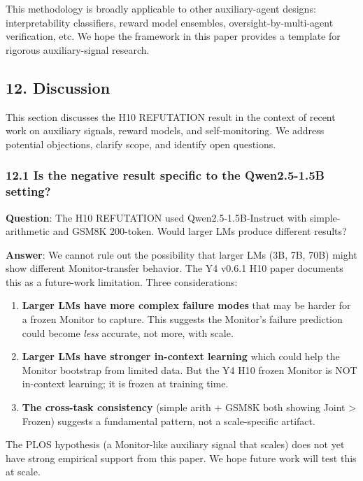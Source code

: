 \documentclass[11pt]{article}
\begin{document}
This methodology is broadly applicable to other auxiliary-agent designs:
interpretability classifiers, reward model ensembles,
oversight-by-multi-agent verification, etc. We hope the framework in
this paper provides a template for rigorous auxiliary-signal research.

\subsection{12. Discussion}\label{discussion}

This section discusses the H10 REFUTATION result in the context of
recent work on auxiliary signals, reward models, and self-monitoring. We
address potential objections, clarify scope, and identify open
questions.

\subsubsection{12.1 Is the negative result specific to the Qwen2.5-1.5B
setting?}\label{is-the-negative-result-specific-to-the-qwen2.5-1.5b-setting}

\textbf{Question}: The H10 REFUTATION used Qwen2.5-1.5B-Instruct with
simple- arithmetic and GSM8K 200-token. Would larger LMs produce
different results?

\textbf{Answer}: We cannot rule out the possibility that larger LMs (3B,
7B, 70B) might show different Monitor-transfer behavior. The Y4 v0.6.1
H10 paper documents this as a future-work limitation. Three
considerations:

\begin{enumerate}
\def\labelenumi{\arabic{enumi}.}
\item
  \textbf{Larger LMs have more complex failure modes} that may be harder
  for a frozen Monitor to capture. This suggests the Monitor's failure
  prediction could become \emph{less} accurate, not more, with scale.
\item
  \textbf{Larger LMs have stronger in-context learning} which could help
  the Monitor bootstrap from limited data. But the Y4 H10 frozen Monitor
  is NOT in-context learning; it is frozen at training time.
\item
  \textbf{The cross-task consistency} (simple arith + GSM8K both showing
  Joint \textgreater{} Frozen) suggests a fundamental pattern, not a
  scale-specific artifact.
\end{enumerate}

The PLOS hypothesis (a Monitor-like auxiliary signal that scales) does
not yet have strong empirical support from this paper. We hope future
work will test this at scale.
\end{document}
